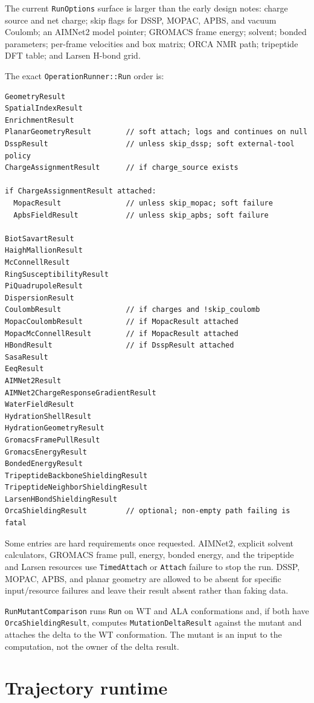 \documentclass[11pt]{article}
\newcommand{\code}[1]{\texttt{#1}}
\begin{document}
The current \code{RunOptions} surface is larger than the early design notes:
charge source and net charge; skip flags for DSSP, MOPAC, APBS, and vacuum
Coulomb; an AIMNet2 model pointer; GROMACS frame energy; solvent; bonded
parameters; per-frame velocities and box matrix; ORCA NMR path; tripeptide DFT
table; and Larsen H-bond grid.

The exact \code{OperationRunner::Run} order is:

\begin{lstlisting}
GeometryResult
SpatialIndexResult
EnrichmentResult
PlanarGeometryResult        // soft attach; logs and continues on null
DsspResult                  // unless skip_dssp; soft external-tool policy
ChargeAssignmentResult      // if charge_source exists

if ChargeAssignmentResult attached:
  MopacResult               // unless skip_mopac; soft failure
  ApbsFieldResult           // unless skip_apbs; soft failure

BiotSavartResult
HaighMallionResult
McConnellResult
RingSusceptibilityResult
PiQuadrupoleResult
DispersionResult
CoulombResult               // if charges and !skip_coulomb
MopacCoulombResult          // if MopacResult attached
MopacMcConnellResult        // if MopacResult attached
HBondResult                 // if DsspResult attached
SasaResult
EeqResult
AIMNet2Result
AIMNet2ChargeResponseGradientResult
WaterFieldResult
HydrationShellResult
HydrationGeometryResult
GromacsFramePullResult
GromacsEnergyResult
BondedEnergyResult
TripeptideBackboneShieldingResult
TripeptideNeighborShieldingResult
LarsenHBondShieldingResult
OrcaShieldingResult         // optional; non-empty path failing is fatal
\end{lstlisting}

Some entries are hard requirements once requested. AIMNet2, explicit solvent
calculators, GROMACS frame pull, energy, bonded energy, and the tripeptide and
Larsen resources use \code{TimedAttach} or \code{Attach} failure to stop the
run. DSSP, MOPAC, APBS, and planar geometry are allowed to be absent for
specific input/resource failures and leave their result absent rather than
faking data.

\code{RunMutantComparison} runs \code{Run} on WT and ALA conformations and, if
both have \code{OrcaShieldingResult}, computes \code{MutationDeltaResult}
against the mutant and attaches the delta to the WT conformation. The mutant
is an input to the computation, not the owner of the delta result.

\section{Trajectory runtime}
\end{document}

